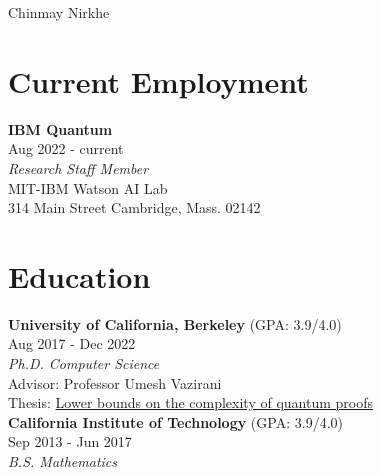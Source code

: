 \documentclass[11pt]{article}
\begin{document}


\par{
		{\LARGE {Chinmay Nirkhe}
	}\bigskip\par}



\section{Current Employment}
\textbf{IBM Quantum} \\
Aug 2022 - current \\

\textit{Research Staff Member} \\
MIT-IBM Watson AI Lab \\
314 Main Street Cambridge, Mass. 02142


\section{Education}

\textbf{University of California, Berkeley} ({\small \textsc{GPA}: 3.9/4.0}) \\
Aug 2017 - Dec 2022\\

\textit{Ph.D. Computer Science} \\
Advisor: Professor Umesh Vazirani \\ 
Thesis: \href{https://www2.eecs.berkeley.edu/Pubs/TechRpts/2022/EECS-2022-184.html}{Lower bounds on the complexity of quantum proofs} \\

\textbf{California Institute of Technology} ({\small \textsc{GPA}: 3.9/4.0}) \\
Sep 2013 - Jun 2017 \\

\textit{B.S. Mathematics}
\end{document}
